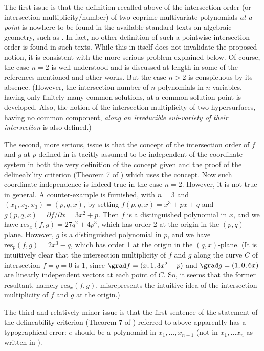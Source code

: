 \documentclass{article}
\begin{document}
The first issue is that the definition recalled above of the
intersection order (or intersection multiplicity/number) 
of two coprime multivariate polynomials {\em at a point}
is nowhere to be found in the available standard
texts on algebraic geometry, such as \cite{CoxLittleOShea2005,
Harris1992, Hartshorne1977, Shafarevich2013}.
In fact, no other definition of such a pointwise intersection
order is found in such texts.
While this in itself does not invalidate the proposed notion,
it is consistent with the more serious problem explained below.
Of course, the case $n = 2$ is well understood and is discussed at 
length in some of the references mentioned and other works. 
But the case $n > 2$ 
is conspicuous by its absence. (However, the intersection number of $n$ 
polynomials in $n$ variables, having only finitely many common 
solutions, at a common solution point
is developed. Also, the notion of the intersection multiplicity of two 
hypersurfaces, having no common component, {\em along an irreducible
sub-variety of their intersection} is also defined.)

The second, more serious, issue is that the concept of the intersection
order of $f$ and $g$ at $p$ defined in \cite{MNDS20} is tacitly
assumed to be independent of the coordinate system in both the very definition of the concept
given and the proof of the delineability criterion (Theorem 7 of \cite{MNDS20}) which uses the concept. 
Now such coordinate independence is indeed true in the case $n = 2$.
However, it is not true in general. A counter-example is
furnished, with $n = 3$ and $(x_1, x_2, x_3) = (p, q, x)$, 
by setting $f(p, q, x) = x^3 + p x + q$
and $g(p, q, x) = \partial f/\partial x = 3 x^2 + p$.
Then $f$ is a distinguished polynomial in $x$, and we have
$\mathrm{res}_x(f,g) = 27q^2 + 4p^3$, which
has order 2 at the origin in the $(p,q)$-plane.
However, $g$ is a distinguished polynomial in $p$, and we have
$\mathrm{res}_p(f,g) = 2 x^3 - q$, which has order 1 at the origin
in the $(q,x)$-plane.
(It is intuitively clear that the intersection 
multiplicity of $f$ and $g$
along the curve $C$ of intersection $f = g = 0$ is 1,
since $\grad f = (x, 1, 3x^2 + p)$ and $\grad g = (1, 0, 6x)$
are linearly independent vectors at each point of $C$.
So, it seems that the former resultant, namely $\mathrm{res}_x(f,g)$,
misrepresents the intuitive idea of the intersection multiplicity of 
$f$ and $g$ at the origin.)

The third and relatively minor issue is that the first sentence of the
statement of the delineability criterion (Theorem 7 of \cite{MNDS20})
referred to above apparently has a typographical error: $e$ should be a polynomial in $x_1, \ldots, x_{n-1}$ (not in $x_1, \dots x_n$ as written in \cite{MNDS20}).
\end{document}
